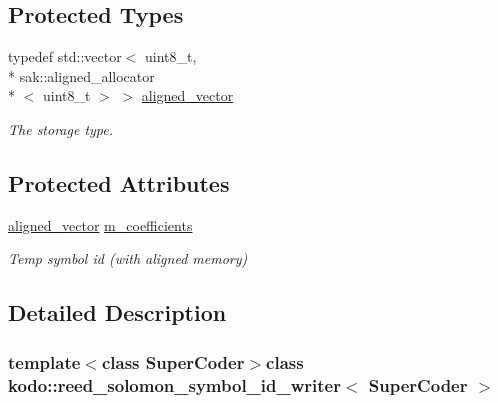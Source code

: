 \subsection*{Protected Types}
\begin{DoxyCompactItemize}
\item 
\hypertarget{classkodo_1_1reed__solomon__symbol__id__writer_a66aeae3c6acbf4c27f8f7d7974473c1b}{typedef std\-::vector$<$ uint8\-\_\-t, \\*
sak\-::aligned\-\_\-allocator\\*
$<$ uint8\-\_\-t $>$ $>$ \hyperlink{classkodo_1_1reed__solomon__symbol__id__writer_a66aeae3c6acbf4c27f8f7d7974473c1b}{aligned\-\_\-vector}}\label{classkodo_1_1reed__solomon__symbol__id__writer_a66aeae3c6acbf4c27f8f7d7974473c1b}

\begin{DoxyCompactList}\small\item\em The storage type. \end{DoxyCompactList}\end{DoxyCompactItemize}
\subsection*{Protected Attributes}
\begin{DoxyCompactItemize}
\item 
\hypertarget{classkodo_1_1reed__solomon__symbol__id__writer_a30eb4b695446e118e7625ee3524a0d47}{\hyperlink{classkodo_1_1reed__solomon__symbol__id__writer_a66aeae3c6acbf4c27f8f7d7974473c1b}{aligned\-\_\-vector} \hyperlink{classkodo_1_1reed__solomon__symbol__id__writer_a30eb4b695446e118e7625ee3524a0d47}{m\-\_\-coefficients}}\label{classkodo_1_1reed__solomon__symbol__id__writer_a30eb4b695446e118e7625ee3524a0d47}

\begin{DoxyCompactList}\small\item\em Temp symbol id (with aligned memory) \end{DoxyCompactList}\end{DoxyCompactItemize}


\subsection{Detailed Description}
\subsubsection*{template$<$class Super\-Coder$>$class kodo\-::reed\-\_\-solomon\-\_\-symbol\-\_\-id\-\_\-writer$<$ Super\-Coder $>$}

